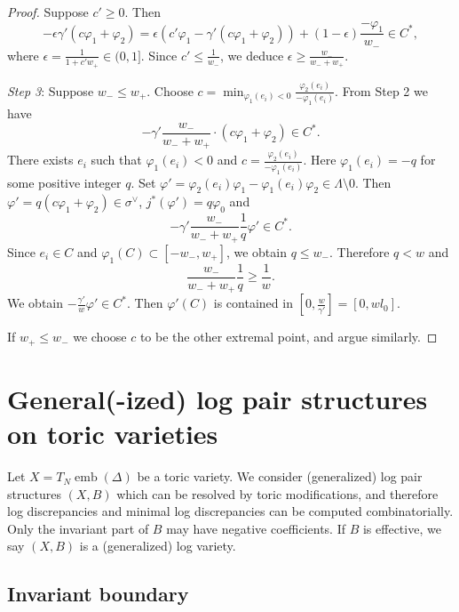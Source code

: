 \documentclass[12pt,twoside]{amsart}
\newcommand{\emb}{\operatorname{emb}}
\theoremstyle{plain}
\theoremstyle{definition}
\theoremstyle{remark}
\begin{document}
\begin{proof}
	Suppose $c'\ge 0$. Then 
	$$
	-\epsilon\gamma'(c\varphi_1+\varphi_2)=\epsilon(c'\varphi_1-\gamma'(c\varphi_1+\varphi_2))+(1-\epsilon)\frac{-\varphi_1}{w_-}\in C^*,
	$$
	where $\epsilon=\frac{1}{1+c'w_+}\in (0,1]$.
	Since $c'\le \frac{1}{w_-}$, we deduce $\epsilon\ge  \frac{w_-}{w_-+w_+}$.
	
	{\em Step 3}:
	Suppose $w_-\le w_+$. Choose $c=\min_{\varphi_1(e_i)<0}\frac{\varphi_2(e_i)}{-\varphi_1(e_i)}$.
	From Step 2 we have
	$$
	-\gamma'\frac{w_-}{w_-+w_+}\cdot (c\varphi_1+\varphi_2)\in C^*.
	$$
	There exists $e_i$ such that $\varphi_1(e_i)<0$ and $c=\frac{\varphi_2(e_i)}{-\varphi_1(e_i)}$.
	Here $\varphi_1(e_i)=-q$ for some positive integer $q$. Set 
	$\varphi'=\varphi_2(e_i)\varphi_1-\varphi_1(e_i) \varphi_2 \in \Lambda\setminus 0$.
	Then $\varphi'=q(c\varphi_1+\varphi_2)\in \sigma^\vee$, $j^*(\varphi')=q\varphi_0$ and
	$$
	-\gamma'\frac{w_-}{w_-+w_+}\frac{1}{q}\varphi' \in C^*.
	$$
	Since $e_i \in C$ and $\varphi_1(C)\subset [-w_-,w_+]$, 
	we obtain $q\le w_-$. Therefore $q<w$ and 
	$$
	\frac{w_-}{w_-+w_+}\frac{1}{q} \ge  \frac{1}{w}.
	$$
	We obtain $-\frac{\gamma'}{w}\varphi'\in C^*$. Then $\varphi'(C)$ is contained
	in $[0,\frac{w}{\gamma'}]=[0,wl_0]$.
	
	If $w_+\le w_-$ we choose $c$ to be the other extremal point, and argue similarly.
\end{proof}


\section{General(-ized) log pair structures on toric varieties}


Let $X=T_N\emb(\Delta)$ be a toric variety. We consider (generalized) log pair structures $(X,B)$
which can be resolved by toric modifications, and therefore log discrepancies 
and minimal log discrepancies can be computed combinatorially. Only the
invariant part of $B$ may have negative coefficients. 
If $B$ is effective, we say $(X,B)$ is a (generalized) log variety.


\subsection{Invariant boundary}
\end{document}
